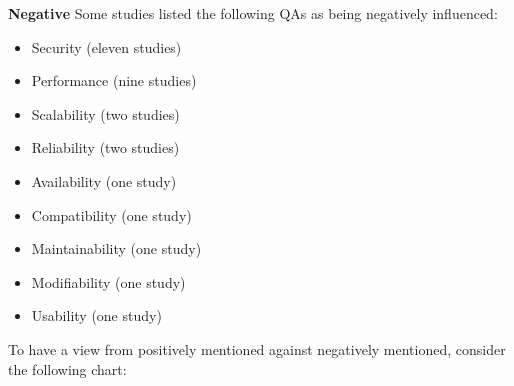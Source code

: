 \textbf{Negative}
Some studies listed the following QAs as being negatively influenced:
\begin{itemize}
    \item Security (eleven studies)
    \item Performance (nine studies)
    \item Scalability (two studies)
    \item Reliability (two studies)
    \item Availability (one study)
    \item Compatibility (one study)
    \item Maintainability (one study)
    \item Modifiability (one study)
    \item Usability (one study)
\end{itemize}

To have a view from positively mentioned against negatively mentioned,
consider the following chart:

